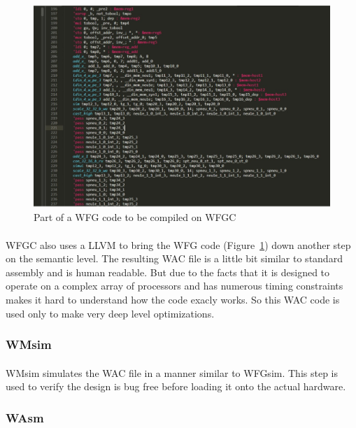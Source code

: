 \begin{figure}[H]
    \centering  
    \includegraphics[trim=0cm 0cm 0cm 0cm, clip=true,scale=0.5]{figures/wfg_eg.jpg}
    \caption{Part of a WFG code to be compiled on WFGC\label{Fig:wfgeg}}\vspace{-4mm}
    \end{figure}

\paragraph{}
WFGC also uses a LLVM to bring the WFG code (Figure~\ref{Fig:wfgeg}) down another step on the semantic level. The resulting WAC file is a little bit similar to standard assembly and is human readable. But due to the facts that it is designed to operate on a complex array of processors and has numerous timing constraints makes it hard to understand how the code exacly works. So this WAC code is used only to make very deep level optimizations.

\subsubsection{WMsim}
\paragraph{}
WMsim simulates the WAC file in a manner similar to WFGsim. This step is used to verify the design is bug free before loading it onto the actual hardware.

\subsubsection{WAsm}
